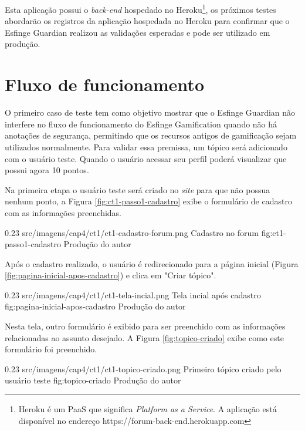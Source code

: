 \par Esta aplicação possui o \textit{back-end} hospedado no Heroku\footnote{Heroku é um PaaS que significa \textit{Platform as a Service}. A aplicação está disponível no endereço https://forum-back-end.herokuapp.com}, os próximos testes abordarão os registros da aplicação hospedada no Heroku para confirmar que o Esfinge Guardian realizou as validações esperadas e pode ser utilizado em produção.

\section{Fluxo de funcionamento}

\par O primeiro caso de teste tem como objetivo mostrar que o Esfinge Guardian não interfere no fluxo de funcionamento do Esfinge Gamification quando não há anotações de segurança, permitindo que os recursos antigos de gamificação sejam utilizados normalmente. Para validar essa premissa, um tópico será adicionado com o usuário teste. Quando o usuário acessar seu perfil poderá visualizar que possui agora 10 pontos.

\par Na primeira etapa o usuário teste será criado no \textit{site} para que não possua nenhum ponto, a Figura \ref{fig:ct1-passo1-cadastro} exibe o formulário de cadastro com as informações preenchidas.

\begin{image}
{0.23}
{src/imagens/cap4/ct1/ct1-cadastro-forum.png}
{Cadastro no forum}
{fig:ct1-passo1-cadastro}
{Produção do autor}
\end{image}

\par Após o cadastro realizado, o usuário é redirecionado para a página inicial (Figura \ref{fig:pagina-inicial-apos-cadastro}) e clica em "Criar tópico".

\begin{image}
{0.23}
{src/imagens/cap4/ct1/ct1-tela-incial.png}
{Tela incial após cadastro}
{fig:pagina-inicial-apos-cadastro}
{Produção do autor}
\end{image}

\par Nesta tela, outro formulário é exibido para ser preenchido com as informações relacionadas ao assunto desejado. A Figura \ref{fig:topico-criado} exibe como este formulário foi preenchido.

\begin{image}
{0.23}
{src/imagens/cap4/ct1/ct1-topico-criado.png}
{Primeiro tópico criado pelo usuário teste}
{fig:topico-criado}
{Produção do autor}
\end{image}

